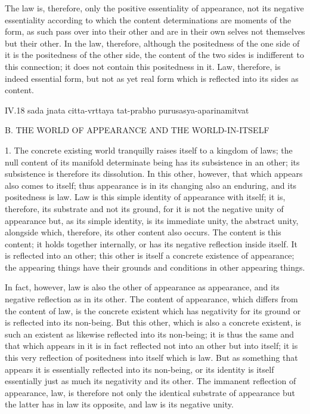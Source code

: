 The law is, therefore, only
the positive essentiality of appearance,
not its negative essentiality according to which
the content determinations are moments of the form,
as such pass over into their other
and are in their own selves
not themselves but their other.
In the law, therefore, although
the positedness of the one side of it is
the positedness of the other side,
the content of the two sides is
indifferent to this connection;
it does not contain this positedness in it.
Law, therefore, is indeed essential form,
but not as yet real form which is reflected
into its sides as content.

IV.18
sada jnata citta-vrttaya tat-prabho purusasya-aparinamitvat

B. THE WORLD OF APPEARANCE AND THE WORLD-IN-ITSELF

1. The concrete existing world tranquilly
raises itself to a kingdom of laws;
the null content of its manifold determinate being
has its subsistence in an other;
its subsistence is therefore its dissolution.
In this other, however, that which appears also comes to itself;
thus appearance is in its changing also an enduring,
and its positedness is law.
Law is this simple identity of appearance with itself;
it is, therefore, its substrate and not its ground,
for it is not the negative unity of appearance
but, as its simple identity, is its immediate unity,
the abstract unity, alongside which, therefore,
its other content also occurs.
The content is this content; it holds together internally,
or has its negative reflection inside itself.
It is reflected into an other;
this other is itself a concrete existence of appearance;
the appearing things have their grounds and conditions
in other appearing things.

In fact, however, law is also
the other of appearance as appearance,
and its negative reflection as in its other.
The content of appearance,
which differs from the content of law,
is the concrete existent
which has negativity for its ground
or is reflected into its non-being.
But this other, which is also a concrete existent,
is such an existent as likewise reflected into its non-being;
it is thus the same and that which appears in it
is in fact reflected not into an other but into itself;
it is this very reflection of positedness into itself
which is law.
But as something that appears
it is essentially reflected into its non-being,
or its identity is itself essentially
just as much its negativity and its other.
The immanent reflection of appearance,
law, is therefore not only
the identical substrate of appearance
but the latter has in law its opposite,
and law is its negative unity.

